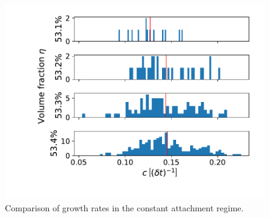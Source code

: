 \documentclass[smaller,notes=hide]{beamer}
\begin{document}
\begin{frame}
\begin{columns}
\begin{figure}[h]
\begin{center}
\includegraphics[width = 1 \textwidth]{const_growth_rate_histogram_comparison.pdf}
\caption[Constant attachment rate measurements from production data]{Comparison of growth rates in the constant attachment regime.}
\label{fig:constant_growth_rates}
\end{center}
\end{figure}
\end{columns}
\end{frame}
\end{document}

